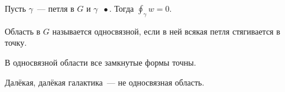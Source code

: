 \documentclass[12pt,timbord]{../../../notes}
\begin{document}
\begin{cor}\label{imp:lineint::homotopy::loophomdot}
  Пусть $\gamma$~--- петля в $G$ и $\gamma \mathop{\overset{G}{\sim}} \bullet$. Тогда
  $\displaystyle\oint_\gamma w = 0$.
\end{cor}



\begin{defn}\label{defn:lineint::homotopy::simpconn}
  Область в $G$ называется односвязной, если в ней всякая петля стягивается в точку.
\end{defn}

\begin{thrm}\label{thrm:lineint::homotopy::simpconn}
  В односвязной области все замкнутые формы точны.
\end{thrm}
\begin{exmp*}
  Далёкая, далёкая галактика~--- не односвязная область.
\end{exmp*}
\end{document}
